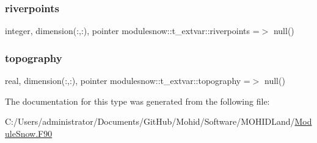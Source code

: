 \subsubsection{\texorpdfstring{riverpoints}{riverpoints}}
{\footnotesize\ttfamily integer, dimension(\+:,\+:), pointer modulesnow\+::t\+\_\+extvar\+::riverpoints =$>$ null()\hspace{0.3cm}{\ttfamily [private]}}

\mbox{\label{structmodulesnow_1_1t__extvar_a968613b8dcb515b20744ba65f7e0671e}} 
\subsubsection{\texorpdfstring{topography}{topography}}
{\footnotesize\ttfamily real, dimension(\+:,\+:), pointer modulesnow\+::t\+\_\+extvar\+::topography =$>$ null()\hspace{0.3cm}{\ttfamily [private]}}



The documentation for this type was generated from the following file\+:\begin{DoxyCompactItemize}
\item 
C\+:/\+Users/administrator/\+Documents/\+Git\+Hub/\+Mohid/\+Software/\+M\+O\+H\+I\+D\+Land/\mbox{\hyperlink{_module_snow_8_f90}{Module\+Snow.\+F90}}\end{DoxyCompactItemize}

